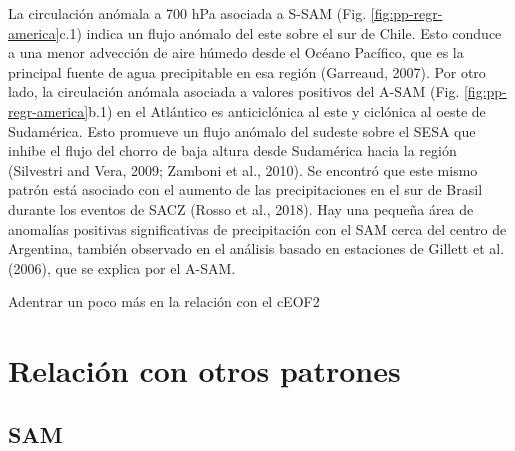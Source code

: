 \documentclass[12pt,oneside]{reedthesis}
\begin{document}
La circulación anómala a 700 hPa asociada a S-SAM (Fig. \ref{fig:pp-regr-america}c.1) indica un flujo anómalo del este sobre el sur de Chile.
Esto conduce a una menor advección de aire húmedo desde el Océano Pacífico, que es la principal fuente de agua precipitable en esa región (Garreaud, 2007).
Por otro lado, la circulación anómala asociada a valores positivos del A-SAM (Fig. \ref{fig:pp-regr-america}b.1) en el Atlántico es anticiclónica al este y ciclónica al oeste de Sudamérica.
Esto promueve un flujo anómalo del sudeste sobre el SESA que inhibe el flujo del chorro de baja altura desde Sudamérica hacia la región (Silvestri and Vera, 2009; Zamboni et al., 2010).
Se encontró que este mismo patrón está asociado con el aumento de las precipitaciones en el sur de Brasil durante los eventos de SACZ (Rosso et al., 2018).
Hay una pequeña área de anomalías positivas significativas de precipitación con el SAM cerca del centro de Argentina, también observado en el análisis basado en estaciones de Gillett et al. (2006), que se explica por el A-SAM.

Adentrar un poco más en la relación con el cEOF2

\hypertarget{relaciuxf3n-con-otros-patrones}{%
\section{Relación con otros patrones}\label{relaciuxf3n-con-otros-patrones}}

\hypertarget{sam}{%
\subsection{SAM}\label{sam}}
\end{document}
